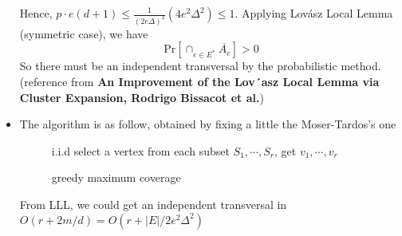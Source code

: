 \documentclass[12pt]{article}
\newenvironment{solution}[2][Solution]{\begin{trivlist}
\item[\hskip \labelsep {\bfseries #1}\hskip \labelsep {\bfseries #2.}]}{\end{trivlist}}
\begin{document}
\begin{solution}{1}
\begin{itemize}
        Hence, $p\cdot e(d+1) \le \frac{1}{(2e\Delta)^2}(4e^2\Delta^2) \le 1$.
        Applying Lovász Local Lemma (symmetric case), we have
        \[\mathrm{Pr}[\cap_{e\in E^*}\overline{A_e}] > 0\]
        So there must be an independent transversal by the probabilistic method.
        (reference from \textbf{An Improvement of the Lov´asz Local Lemma via Cluster Expansion, Rodrigo Bissacot et al.})
        \item The algorithm is as follow, obtained by fixing a little the Moser-Tardos's one
        \\[60pt]
        \begin{figure}[ht]
            \centering
            \begin{minipage}{.75\linewidth}
        \begin{algorithm}[H]
            \caption{greedy maximum coverage}
            i.i.d select a vertex from each subset $S_1, \cdots, S_r$, get $v_1, \cdots, v_r$ \;
        \end{algorithm}
    \end{minipage}
\end{figure}

        From LLL, we could get an independent transversal in $O(r+2m/d) = O(r+|E|/2e^2\Delta^2)$
    \end{itemize}
\end{solution}
\end{document}

